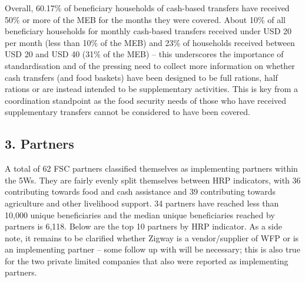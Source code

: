 \documentclass[
]{article}
\begin{document}
Overall, 60.17\% of beneficiary households of cash-based transfers have
received 50\% or more of the MEB for the months they were covered. About
10\% of all beneficiary households for monthly cash-based transfers
received under USD 20 per month (less than 10\% of the MEB) and 23\% of
households received between USD 20 and USD 40 (31\% of the MEB) -- this
underscores the importance of standardisation and of the pressing need
to collect more information on whether cash transfers (and food baskets)
have been designed to be full rations, half rations or are instead
intended to be supplementary activities. This is key from a coordination
standpoint as the food security needs of those who have received
supplementary transfers cannot be considered to have been covered.

\hypertarget{partners}{%
\subsection{3. Partners}\label{partners}}

A total of 62 FSC partners classified themselves as implementing
partners within the 5Ws. They are fairly evenly split themselves between
HRP indicators, with 36 contributing towards food and cash assistance
and 39 contributing towards agriculture and other livelihood support. 34
partners have reached less than 10,000 unique beneficiaries and the
median unique beneficiaries reached by partners is 6,118. Below are the
top 10 partners by HRP indicator. As a side note, it remains to be
clarified whether Zigway is a vendor/supplier of WFP or is an
implementing partner -- some follow up with will be necessary; this is
also true for the two private limited companies that also were reported
as implementing partners.
\end{document}
